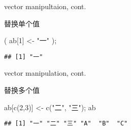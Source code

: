 \documentclass[ignorenonframetext,]{beamer}
\newenvironment{Shaded}{\begin{snugshade}}{\end{snugshade}}
\newcommand{\DecValTok}[1]{\textcolor[rgb]{0.00,0.00,0.81}{#1}}
\newcommand{\FunctionTok}[1]{\textcolor[rgb]{0.00,0.00,0.00}{#1}}
\newcommand{\NormalTok}[1]{#1}
\newcommand{\OtherTok}[1]{\textcolor[rgb]{0.56,0.35,0.01}{#1}}
\newcommand{\StringTok}[1]{\textcolor[rgb]{0.31,0.60,0.02}{#1}}
\newcommand\FontSmall{\fontsize{7}{8}\selectfont}
\begin{document}
\begin{frame}[fragile]{vector manipultaion, cont.}
\protect\hypertarget{vector-manipultaion-cont.}{}
\begin{block}{替换单个值}
\protect\hypertarget{ux66ffux6362ux5355ux4e2aux503c}{}
\FontSmall

\begin{Shaded}
\begin{Highlighting}[]
\NormalTok{( ab[}\DecValTok{1}\NormalTok{] }\OtherTok{\textless{}{-}} \StringTok{"一"}\NormalTok{ );}
\end{Highlighting}
\end{Shaded}

\begin{verbatim}
## [1] "一"
\end{verbatim}
\end{block}
\end{frame}

\begin{frame}[fragile]{vector manipulation, cont.}
\protect\hypertarget{vector-manipulation-cont.-1}{}
\begin{block}{替换多个值}
\protect\hypertarget{ux66ffux6362ux591aux4e2aux503c}{}
\FontSmall

\begin{Shaded}
\begin{Highlighting}[]
\NormalTok{ab[}\FunctionTok{c}\NormalTok{(}\DecValTok{2}\NormalTok{,}\DecValTok{3}\NormalTok{)] }\OtherTok{\textless{}{-}} \FunctionTok{c}\NormalTok{(}\StringTok{"二"}\NormalTok{, }\StringTok{"三"}\NormalTok{);}
\NormalTok{ab}
\end{Highlighting}
\end{Shaded}

\begin{verbatim}
## [1] "一" "二" "三" "A"  "B"  "C"
\end{verbatim}
\end{block}
\end{frame}
\end{document}
